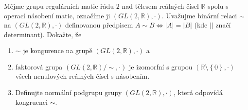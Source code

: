 \subsubsection{}
Mějme grupu regulárních matic řádu 2 nad tělesem reálných čísel $\mathbb{R}$ spolu s operací
násobení matic, označíme ji $(GL(2,\mathbb{R}),\cdot)$. Uvažujme binární relaci
$\sim$ na $(GL(2,\mathbb{R}),\cdot)$ definovanou předpisem $A \sim B
\Leftrightarrow |A| = |B|$ (kde $||$ značí determinant). Dokažte, že
\begin{enumerate}
  \item $\sim$ je kongurence na grupě $(GL(2,\mathbb{R}),\cdot)$ a
  \item faktorová grupa $(GL(2,\mathbb{R})/\sim,\cdot)$ je izomorfní s grupou
  $(\mathbb{R} \setminus \left \{ 0 \right \} ,\cdot )$ všech nenulových
reálných čísel s násobením.
  \item Definujte normální podgrupu grupy $(GL(2,\mathbb{R}),\cdot)$, která
  odpovídá kongruenci $\sim$.
\end{enumerate}
